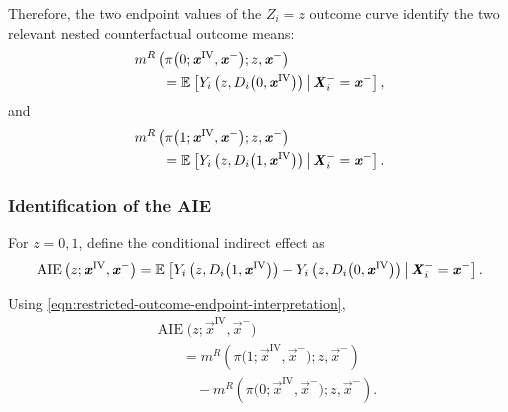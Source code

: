 Therefore, the two endpoint values of the $Z_i=z$ outcome curve identify the two relevant nested counterfactual outcome means:
\[
    \begin{aligned}
    &m^R
    \left(
        \pi
        \big(
            0;
            \boldsymbol{\mathit{x}}^{\mathrm{IV}},
            \boldsymbol{\mathit{x}}^-
        \big);
        z,
        \boldsymbol{\mathit{x}}^-
    \right)
    \\
    &\qquad=
    \mathbb{E}_{} \left[ 
        Y_i
        \left(
            z,
            D_i
            \big(
                0,
                \boldsymbol{\mathit{x}}^{\mathrm{IV}}
            \big)
        \right)
     \, \middle\vert \, 
        \boldsymbol{\mathit{X}}_i^-=\boldsymbol{\mathit{x}}^-
     \right],
    \end{aligned}
\]
and
\[
    \begin{aligned}
    &m^R
    \left(
        \pi
        \big(
            1;
            \boldsymbol{\mathit{x}}^{\mathrm{IV}},
            \boldsymbol{\mathit{x}}^-
        \big);
        z,
        \boldsymbol{\mathit{x}}^-
    \right)
    \\
    &\qquad=
    \mathbb{E}_{} \left[ 
        Y_i
        \left(
            z,
            D_i
            \big(
                1,
                \boldsymbol{\mathit{x}}^{\mathrm{IV}}
            \big)
        \right)
     \, \middle\vert \, 
        \boldsymbol{\mathit{X}}_i^-=\boldsymbol{\mathit{x}}^-
     \right].
    \end{aligned}
\]

\subsubsection{Identification of the AIE}

For $z=0,1$, define the conditional indirect effect as
\[
    \begin{aligned}
    \operatorname{AIE}
    \big(
        z;
        \boldsymbol{\mathit{x}}^{\mathrm{IV}},
        \boldsymbol{\mathit{x}}^-
    \big)
    =
    \mathbb{E}_{} \left[ 
        Y_i
        \left(
            z,
            D_i
            \big(
                1,
                \boldsymbol{\mathit{x}}^{\mathrm{IV}}
            \big)
        \right)
        -
        Y_i
        \left(
            z,
            D_i
            \big(
                0,
                \boldsymbol{\mathit{x}}^{\mathrm{IV}}
            \big)
        \right)
     \, \middle\vert \, 
        \boldsymbol{\mathit{X}}_i^-=\boldsymbol{\mathit{x}}^-
     \right].
    \end{aligned}
    \label{eqn:conditional-aie-definition}
\]

Using \eqref{eqn:restricted-outcome-endpoint-interpretation},
\[
    \begin{aligned}
    &\operatorname{AIE}
    \big(
        z;
        \vec x^{\mathrm{IV}},
        \vec x^-
    \big)
    \\
    &\qquad=
    m^R
    \left(
        \pi
        \big(
            1;
            \vec x^{\mathrm{IV}},
            \vec x^-
        \big);
        z,
        \vec x^-
    \right)
    \\
    &\qquad\quad-
    m^R
    \left(
        \pi
        \big(
            0;
            \vec x^{\mathrm{IV}},
            \vec x^-
        \big);
        z,
        \vec x^-
    \right).
    \end{aligned}
    \label{eqn:conditional-aie-endpoint-difference}
\]

